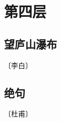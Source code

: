 \documentclass[12pt,UTF-8,openany]{ctexbook}
\begin{document}
\vspace{8pt}


\chapter{第四层}

\section{望庐山瀑布}

\begin{center}
    \vspace{10pt}
    
    \begin{normalsize}
        
        〔李白〕
        
    \end{normalsize}
    
    \vspace{8pt}
    
    \begin{large}
        
        
        
    \end{large}
    
\end{center}

\vspace{8pt}


\section{绝句}

\begin{center}
    \vspace{10pt}
    
    \begin{normalsize}
        
        〔杜甫〕
        
    \end{normalsize}
    
    \vspace{8pt}
    
    \begin{large}
        
        
        
    \end{large}
    
\end{center}
\end{document}
